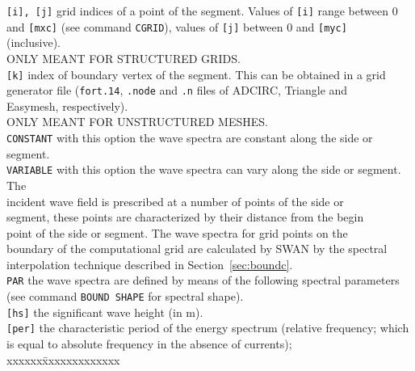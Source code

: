 \documentclass[12pt]{book}
\begin{document}
\begin{tabbing}
{\tt [i], [j]}       \> grid indices of a point of the segment. Values of {\tt [i]} range between 0\+\\
                        and {\tt [mxc]} (see command {\tt CGRID}), values of {\tt [j]} between 0 and {\tt [myc]}\\
                        (inclusive).\\
                        ONLY MEANT FOR STRUCTURED GRIDS.\-\\
{\tt [k]}            \> index of boundary vertex of the segment. This can be obtained in a grid\+\\
                        generator file ({\tt fort.14}, {\tt .node} and {\tt.n} files of ADCIRC, Triangle and\\
                        Easymesh, respectively).\\
                        ONLY MEANT FOR UNSTRUCTURED MESHES.\-\\
{\tt CONSTANT}       \> with this option the wave spectra are constant along the side or segment.\\
{\tt VARIABLE}       \> with this option the wave spectra can vary along the side or segment. The\+\\
                        incident wave field is prescribed at a number of points of the side or\\
                        segment, these points are characterized by their distance from the begin\\
                        point of the side or segment. The wave spectra for grid points on the\\
                        boundary of the computational grid are calculated by SWAN by the spectral\\
                        interpolation technique described in Section~\ref{sec:boundc}.\-\\
{\tt PAR}            \> the wave spectra are defined by means of the following spectral parameters\+\\
                        (see command {\tt BOUND SHAPE} for spectral shape).\-\\
{\tt [hs]}           \> the significant wave height (in m).\\
{\tt [per]}          \> the characteristic period of the energy spectrum (relative frequency; which\+\\
                        is equal to absolute frequency in the absence of currents);\\
                        \pushtabs
                        xxxxxx\=xxxxxxxxxxxxx \kill

\end{tabbing}
\end{document}

